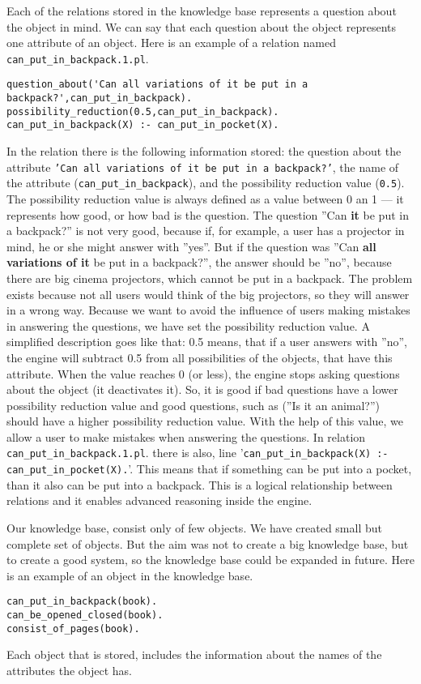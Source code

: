 \documentclass[a4paper]{article}
\begin{document}
Each of the relations stored in the knowledge base represents a question about the object in mind. We can say that each question about the object represents one attribute of an object. Here is an example of a relation named \verb|can_put_in_backpack.1.pl|.
\begin{lstlisting}[caption=Relation can\_put\_in\_backpack.1.pl,label=lst:relationexample]
question_about('Can all variations of it be put in a backpack?',can_put_in_backpack).
possibility_reduction(0.5,can_put_in_backpack).
can_put_in_backpack(X) :- can_put_in_pocket(X).
\end{lstlisting}
In the relation there is the following information stored: the question about the attribute \texttt{'Can all variations of it be put in a backpack?'}, the name of the attribute (\texttt{can\_put\_in\_backpack}), and the possibility reduction value (\verb|0.5|). The possibility reduction value is always defined as a value between 0 an 1 --- it represents how good, or how bad is the question. The question ''Can \textbf{it} be put in a backpack?'' is not very good, because if, for example, a user has a projector in mind, he or she might answer with ''yes''. But if the question was ''Can \textbf{all variations of it} be put in a backpack?'', the answer should be ''no'', because there are big cinema projectors, which cannot be put in a backpack. The problem exists because not all users would think of the big projectors, so they will answer in a wrong way. Because we want to avoid the influence of users making mistakes in answering the questions, we have set the possibility reduction value. A simplified description goes like that: 0.5 means, that if a user answers with ''no'', the engine will subtract 0.5 from all possibilities of the objects, that have this attribute. When the value reaches 0 (or less), the engine stops asking questions about the object (it deactivates it). So, it is good if bad questions have a lower possibility reduction value and good questions, such as (''Is it an animal?'') should have a higher possibility reduction value. With the help of this value, we allow a user to make mistakes when answering the questions.
In relation \verb|can_put_in_backpack.1.pl|. there is also, line '\verb|can_put_in_backpack(X) :- can_put_in_pocket(X).|'. This means that if something can be put into a pocket, than it also can be put into a backpack. This is a logical relationship between relations and it enables advanced reasoning inside the engine. 

Our knowledge base, consist only of few objects. We have created small but complete set of objects. But the aim was not to create a big knowledge base, but to create a good system, so the knowledge base could be expanded in future. Here is an example of an object in the knowledge base.
\begin{lstlisting}[caption=Object book.pl,label=lst:objectexample]
can_put_in_backpack(book).
can_be_opened_closed(book).
consist_of_pages(book).
\end{lstlisting}
Each object that is stored, includes the information about the names of the attributes the object has.
\end{document}
